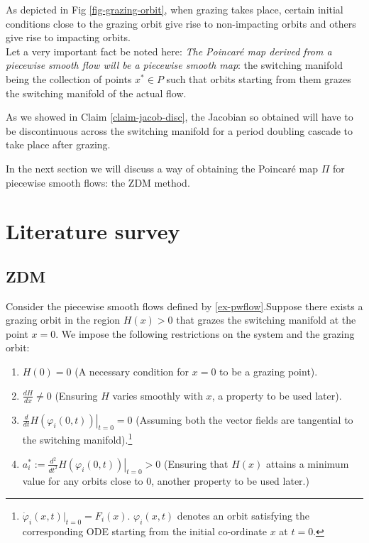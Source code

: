 \documentclass{book}
\renewcommand{\(}{\begin{columns}}
\renewcommand{\)}{\end{columns}}
\newcommand{\<}[1]{\begin{column}{#1}}
\renewcommand{\>}{\end{column}}
\begin{document}
As depicted in Fig \ref{fig-grazing-orbit}, when grazing takes place, certain 
initial conditions close to the grazing orbit give rise to non-impacting 
orbits and others give rise to impacting orbits.  \\


Let a very important fact be noted here: \emph{The Poincaré map derived from a 
piecewise smooth flow  
will be a piecewise smooth map}: the switching manifold being the collection of points 
$x^*\in P$ such that orbits starting from them grazes the switching manifold 
of the actual flow.  

As we showed in Claim \ref{claim-jacob-disc}, the Jacobian so obtained will 
have to be discontinuous across the switching manifold for a period doubling 
cascade to take place after grazing.  


In the next section we will discuss a way of obtaining the Poincaré map 
$\Pi$ for piecewise smooth flows: the ZDM method.  

\section{Literature survey}
\subsection{ZDM}
\label{prop-ZDM}
Consider the piecewise smooth flows defined by \eqref{ex-pwflow}.Suppose 
there exists a grazing orbit in the region $H(x)>0$ that grazes the switching 
manifold at the point $x=0$.  We impose the following restrictions on the 
system and the grazing orbit:

\begin{enumerate}
\item $H(0)=0$ (A necessary condition for $x=0$ to be a grazing point).
\item $\frac{dH}{dx}\neq 0$ (Ensuring $H$ varies smoothly with $x$, a property 
to be used later).
\item $\frac{d}{dt}\left.  H(\varphi_i(0,t))\right|_{t=0}=0$ (Assuming both 
the vector fields are tangential to the switching manifold).\footnote{
$\dot{\varphi}_i(x,t)|_{t=0}=F_i(x)$.  $\varphi_i(x,t)$ denotes an orbit 
satisfying the corresponding ODE starting from the initial co-ordinate 
$x$ at $t=0$.  }
\item $a_i^*:=\frac{d^2}{dt^2}\left.  H(\varphi_i(0,t))\right|_{t=0}>0$ 
(Ensuring that $H(x)$ attains a minimum value for any orbits close to $0$, 
another property to be used later.)\label{crit-minH}
\end{enumerate}
\end{document}
